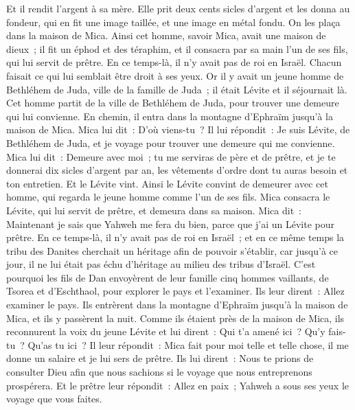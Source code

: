 \begin{multicols}{2}
Et il rendit l'argent à sa mère. Elle prit deux cents sicles d'argent et les donna au fondeur, qui en fit une image taillée, et une image en métal fondu. On les plaça dans la maison de Mica.
Ainsi cet homme, savoir Mica, avait une maison de dieux~; il fit un éphod et des téraphim, et il consacra par sa main l'un de ses fils, qui lui servit de prêtre.
En ce temps-là, il n'y avait pas de roi en Israël. Chacun faisait ce qui lui semblait être droit à ses yeux.
Or il y avait un jeune homme de Bethléhem de Juda, ville de la famille de Juda~; il était Lévite et il séjournait là.
Cet homme partit de la ville de Bethléhem de Juda, pour trouver une demeure qui lui convienne. En chemin, il entra dans la montagne d'Ephraïm jusqu'à la maison de Mica.
Mica lui dit~: D'où viens-tu~? Il lui répondit~: Je suis Lévite, de Bethléhem de Juda, et je voyage pour trouver une demeure qui me convienne.
Mica lui dit~: Demeure avec moi~; tu me serviras de père et de prêtre, et je te donnerai dix sicles d'argent par an, les vêtements d'ordre dont tu auras besoin et ton entretien. Et le Lévite vint.
Ainsi le Lévite convint de demeurer avec cet homme, qui regarda le jeune homme comme l'un de ses fils.
Mica consacra le Lévite, qui lui servit de prêtre, et demeura dans sa maison.
Mica dit~: Maintenant je sais que Yahweh me fera du bien, parce que j'ai un Lévite pour prêtre.
\VerseOne{}En ce temps-là, il n'y avait pas de roi en Israël~; et en ce même temps la tribu des Danites cherchait un héritage afin de pouvoir s'établir, car jusqu'à ce jour, il ne lui était pas échu d'héritage au milieu des tribus d'Israël.
C'est pourquoi les fils de Dan envoyèrent de leur famille cinq hommes vaillants, de Tsorea et d'Eschthaol, pour explorer le pays et l'examiner. Ils leur dirent~: Allez examiner le pays. Ils entrèrent dans la montagne d'Ephraïm jusqu'à la maison de Mica, et ils y passèrent la nuit.
Comme ils étaient près de la maison de Mica, ils reconnurent la voix du jeune Lévite et lui dirent~: Qui t'a amené ici~? Qu'y fais-tu~? Qu'as tu ici~?
Il leur répondit~: Mica fait pour moi telle et telle chose, il me donne un salaire et je lui sers de prêtre.
Ils lui dirent~: Nous te prions de consulter Dieu afin que nous sachions si le voyage que nous entreprenons prospérera.
Et le prêtre leur répondit~: Allez en paix~; Yahweh a sous ses yeux le voyage que vous faites.

\end{multicols}
